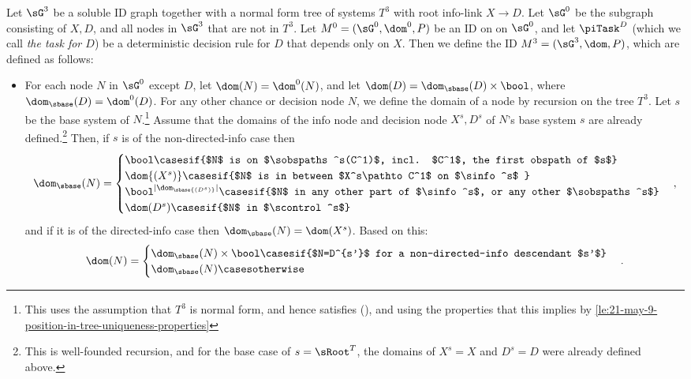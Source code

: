 \begin{definition} \label{def:model-construction}
Let $\sGNewInModelConstruction$ be a soluble ID graph together with a normal form tree of systems $T^3$ with root info-link $X\to D$. Let $\sGoriginalInModelConstruction$ be the subgraph consisting of $X,D$, and all nodes in $\sGNewInModelConstruction$ that are not in $T^3$.
Let $\MoriginalInModelConstruction=(\sGoriginalInModelConstruction, \dom^0, P)$ be an ID on on $\sGoriginalInModelConstruction$, and let $\piTask^{D}$ (which we call \emph{the task for $D$}) be a deterministic decision rule for $D$ that depends only on $X$. 
Then we define the ID $\MnewInModelConstruction=(\sGNewInModelConstruction, \dom, P)$, which are defined as follows:


\begin{itemize}
    \item
    For each node $N$ in $\sGoriginalInModelConstruction$ except $D$, let $\dom(N)=\dom^0(N)$, and let 
    $\dom(D)=\dom_{\sbase}(D)\times \bool$, where
    $\dom_{\sbase}(D)=\dom^0(D)$. 
    For any other chance or decision node $N$, we define the domain of a node by recursion on the tree $T^3$. Let $s$ be the base system of $N$.\footnote{This uses the assumption that $T^3$ is normal form, and hence satisfies  (\systemsAndPathsUniqueness), and using the properties that this implies by \autoref{le:21-may-9-position-in-tree-uniqueness-properties}} 
    Assume that the domains of the info node and decision node $X^s, D^s$ of $N$'s base system $s$ are already defined.\footnote{This is well-founded recursion, and for the base case of $s=\sRoot^T$, the domains of $X^s=X$ and $D^s=D$ were already defined above.} 
    Then, if $s$ is of the non-directed-info case then
        \[\dom_\sbase(N) =
            \begin{cases} 
            \bool \casesif  {$N$ is on $\sobspaths^s(C^1)$, incl. $C^1$, the first obspath of $s$}\\
            \dom{(X^s)} \casesif  {$N$ is in between $X^s\pathto C^1$ on $\sinfo^s$ }\\
            \bool^{|\dom_\sbase{(D^s)}|} \casesif  {$N$ in any other part of  $\sinfo^s$, or any other $\sobspaths^s$}\\
            \dom(D^s) \casesif {$N$ in $\scontrol^s$}
            \end{cases},\]
    and if it is of the directed-info case then $\dom_\sbase(N) = \dom(X^s)$. 
    Based on this:
        \[\dom(N) =
            \begin{cases} 
            \dom_\sbase(N) \times \bool \casesif  {$N=D^{s'}$ for a non-directed-info descendant  $s'$}\\
            \dom_\sbase(N) \casesotherwise
            \end{cases}.\]
    

\end{itemize}
\end{definition}
